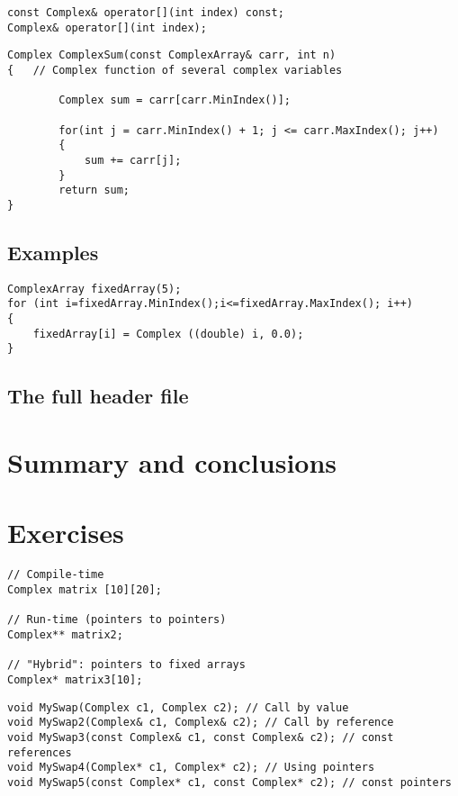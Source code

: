 \begin{lstlisting}
const Complex& operator[](int index) const;
Complex& operator[](int index);
\end{lstlisting}


\begin{lstlisting}
Complex ComplexSum(const ComplexArray& carr, int n)
{	// Complex function of several complex variables

		Complex sum = carr[carr.MinIndex()];

		for(int j = carr.MinIndex() + 1; j <= carr.MaxIndex(); j++)
		{
			sum += carr[j];
		}
		return sum;
}
\end{lstlisting}

\subsection{Examples}

\begin{lstlisting}
ComplexArray fixedArray(5);
for (int i=fixedArray.MinIndex();i<=fixedArray.MaxIndex(); i++)
{
	fixedArray[i] = Complex ((double) i, 0.0);
}
\end{lstlisting}

\subsection{The full header file}




\section{Summary and conclusions}

\section{Exercises}

\begin{lstlisting}
// Compile-time
Complex matrix [10][20];

// Run-time (pointers to pointers)
Complex** matrix2;

// "Hybrid": pointers to fixed arrays
Complex* matrix3[10];
\end{lstlisting}

\begin{lstlisting}
void MySwap(Complex c1, Complex c2); // Call by value
void MySwap2(Complex& c1, Complex& c2); // Call by reference
void MySwap3(const Complex& c1, const Complex& c2); // const references
void MySwap4(Complex* c1, Complex* c2); // Using pointers
void MySwap5(const Complex* c1, const Complex* c2); // const pointers
\end{lstlisting}

